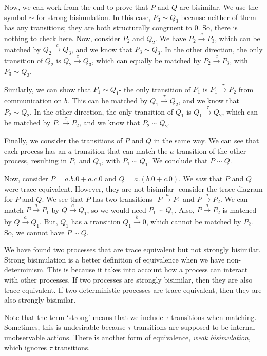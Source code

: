 \documentclass[a4paper, openany]{memoir}
\theoremstyle{definition}
\begin{document}
    Now, we can work from the end to prove that $P$ and $Q$ are bisimilar. We use the symbol $\sim$ for strong bisimulation. In this case, $P_3 \sim Q_3$ because neither of them has any transitions; they are both structurally congruent to $0$. So, there is nothing to check here. Now, consider $P_2$ and $Q_2$. We have $P_2 \xrightarrow{c} P_3$, which can be matched by $Q_2 \xrightarrow{c} Q_3$, and we know that $P_3 \sim Q_3$. In the other direction, the only transition of $Q_2$ is $Q_2 \xrightarrow{c} Q_3$, which can equally be matched by $P_2 \xrightarrow{c} P_3$, with $P_3 \sim Q_3$.

    Similarly, we can show that $P_1 \sim Q_1$- the only transition of $P_1$ is $P_1 \xrightarrow{\tau} P_2$ from communication on $b$. This can be matched by $Q_1 \xrightarrow{\tau} Q_2$, and we know that $P_2 \sim Q_2$. In the other direction, the only transition of $Q_1$ is $Q_1 \xrightarrow{\tau} Q_2$, which can be matched by $P_1 \xrightarrow{\tau} P_2$, and we know that $P_2 \sim Q_2$.

    Finally, we consider the transitions of $P$ and $Q$ in the same way. We can see that each process has an $a$-transition that can match the $a$-transition of the other process, resulting in $P_1$ and $Q_1$, with $P_1 \sim Q_1$. We conclude that $P \sim Q$.

    Now, consider $P = a.b.0 + a.c.0$ and $Q = a.(b.0 + c.0)$. We saw that $P$ and $Q$ were trace equivalent. However, they are not bisimilar- consider the trace diagram for $P$ and $Q$.
    We see that $P$ has two transitions- $P \xrightarrow{a} P_1$ and $P \xrightarrow{a} P_2$. We can match $P \xrightarrow{a} P_1$ by $Q \xrightarrow{a} Q_1$, so we would need $P_1 \sim Q_1$. Also, $P \xrightarrow{a} P_2$ is matched by $Q \xrightarrow{a} Q_1$. But, $Q_1$ has a transition $Q_1 \xrightarrow{b} 0$, which cannot be matched by $P_2$. So, we cannot have $P \sim Q$.

    We have found two processes that are trace equivalent but not strongly bisimilar. Strong bisimulation is a better definition of equivalence when we have non-determinism. This is because it takes into account how a process can interact with other processes. If two processes are strongly bisimilar, then they are also trace equivalent. If two deterministic processes are trace equivalent, then they are also strongly bisimilar.

    Note that the term `strong' means that we include $\tau$ transitions when matching. Sometimes, this is undesirable because $\tau$ transitions are supposed to be internal unobservable actions. There is another form of equivalence, \emph{weak bisimulation}, which ignores $\tau$ transitions.
\end{document}
